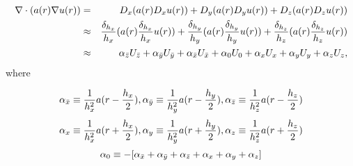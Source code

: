 \documentclass[10pt]{article}
\begin{document}
\begin{center}
\begin{minipage}{1.5in}
\end{minipage} 
\end{center}


 \begin{eqnarray*}
 \nabla\cdot(a(r) \nabla u(r)) & = & D_x (a(r) D_x u(r)) + D_y (a(r) D_y u(r)) + D_z (a(r) D_z u(r)) \\
 & \approx & \frac{\delta_{h_x}}{h_x} (a(r) \frac{\delta_{h_x}}{h_x} u(r)) + 
             \frac{\delta_{h_y}}{h_y} (a(r) \frac{\delta_{h_y}}{h_y} u(r)) + 
             \frac{\delta_{h_z}}{h_z} (a(r) \frac{\delta_{h_z}}{h_z} u(r)) \\
 & \approx & \alpha_{\bar{z}}U_{\bar{z}} +  \alpha_{\bar{y}}U_{\bar{y}} +  \alpha_{\bar{x}}U_{\bar{x}} 
  +  \alpha_{0}U_{0} 
  +  \alpha_{x}U_{x} +  \alpha_{y}U_{y} +  \alpha_{z}U_{z},
 \end{eqnarray*}
where

\[\alpha_{\bar{x}}  \equiv  \frac{1}{h_x^2} a(r-\frac{h_x}{2}),
 \alpha_{\bar{y}}  \equiv  \frac{1}{h_y^2} a(r-\frac{h_y}{2}), 
 \alpha_{\bar{z}}  \equiv  \frac{1}{h_z^2} a(r-\frac{h_z}{2}) \]
 \[\alpha_{x}  \equiv  \frac{1}{h_x^2} a(r+\frac{h_x}{2}), 
 \alpha_{y}  \equiv  \frac{1}{h_y^2} a(r+\frac{h_y}{2}),
 \alpha_{z}  \equiv  \frac{1}{h_z^2} a(r+\frac{h_z}{2}) \]
 \[\alpha_{0}   \equiv  - [\alpha_{\bar{x}} + \alpha_{\bar{y}} + \alpha_{\bar{z}} + \alpha_{x} + \alpha_{y} + \alpha_{z}] \]
\end{document}
